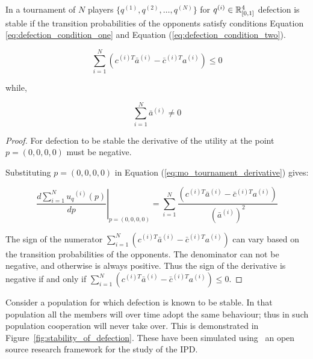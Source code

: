 \begin{lemma}\label{lemma:stability_of_defection}
    In a tournament of \(N\) players \(\{q^{(1)}, q^{(2)}, \dots, q^{(N)} \}\)
    for \(q^{(i)} \in \mathbb{R}_{[0, 1]} ^ 4\)
    defection is stable if the transition probabilities of the
    opponents satisfy conditions Equation \ref{eq:defection_condition_one} and Equation (\ref{eq:defection_condition_two}).

    \begin{equation}\label{eq:defection_condition_one}
        \sum_{i=1} ^ N (c^{(i)T} \bar{a}^{(i)} - \bar{c}^{(i)T} a^{(i)}) \leq 0
    \end{equation}

    while,

    \begin{equation}\label{eq:defection_condition_two}
        \sum_{i=1} ^ N \bar{a}^{(i)} \neq 0
    \end{equation}
\end{lemma}

\begin{proof}
    For defection to be stable the derivative of the utility
    at the point \(p = (0, 0, 0, 0)\) must be negative.

    Substituting \(p = (0, 0, 0, 0)\) in
    Equation (\ref{eq:mo_tournament_derivative}) gives:

    \begin{equation}
        \left.\frac{d\sum\limits_{i=1} ^ {N} {u_q}^{(i)} (p)}{dp} \right\rvert_{p=(0,0,0,0)} =
    \sum_{i=1} ^ N \frac{(c^{(i)T} \bar{a}^{(i)} - \bar{c}^{(i)T} a^{(i)})}
    {(\bar{a}^{(i)})^2}
    \end{equation}

    The sign of the numerator \( \displaystyle\sum_{i=1} ^ N (c^{(i)T} \bar{a}^{(i)} - \bar{c}^{(i)T} a^{(i)})\)
    can vary based on the transition probabilities of the opponents.
    The denominator can not be negative, and otherwise is always positive.
    Thus the sign of the derivative is negative if and only if
    \( \displaystyle\sum_{i=1} ^ N (c^{(i)T} \bar{a}^{(i)} - \bar{c}^{(i)T} a^{(i)}) \leq 0\).
\end{proof}

Consider a population for which defection is known to be stable. In that
population all the members will over time adopt the same behaviour; thus in such
population cooperation will never take over. This is demonstrated in
Figure~\ref{fig:stability_of_defection}.
These have been simulated using~\cite{axelrodproject} an open
source research framework for the study of the IPD.

